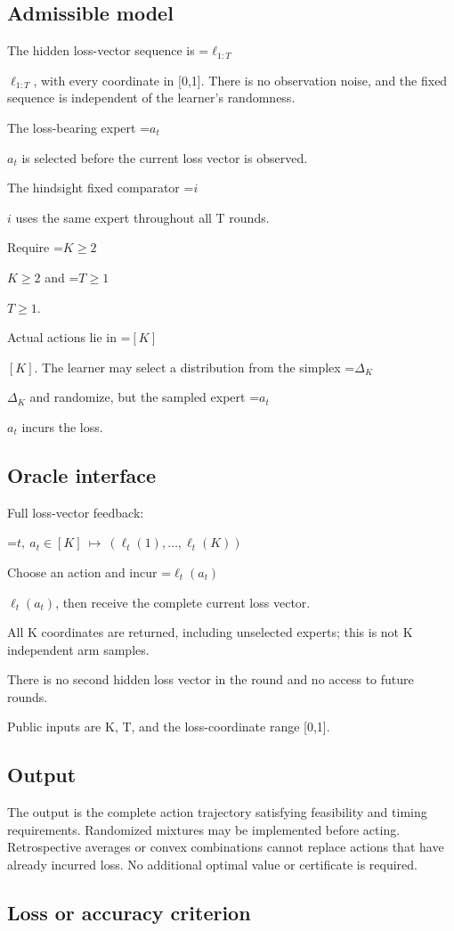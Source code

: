 \documentclass[10pt,a4paper]{article}
\newcommand{\AtlasMath}[1]{\par\begingroup\centering\setbox0=\hbox{$\displaystyle #1$}\ifdim\wd0>1.4\linewidth\typeout{ATLAS WIDE FORMULA: \the\wd0}\fi\ifdim\wd0>\linewidth\resizebox{\linewidth}{!}{\box0}\else\box0\fi\par\endgroup}
\newcommand{\AtlasInlineMath}[1]{\begingroup\setbox0=\hbox{$#1$}\ifdim\wd0>.4\linewidth\endgroup\AtlasMath{#1}\else\endgroup$#1$\fi}
\begin{document}
\subsection{Admissible model}
The hidden loss-vector sequence is \AtlasInlineMath{\ell_{1:T}}, with every coordinate in [0,1]. There is no observation noise, and the fixed sequence is independent of the learner's randomness.

The loss-bearing expert \AtlasInlineMath{a_t} is selected before the current loss vector is observed.

The hindsight fixed comparator \AtlasInlineMath{i} uses the same expert throughout all T rounds.

Require \AtlasInlineMath{K\ge2} and \AtlasInlineMath{T\ge1}.

Actual actions lie in \AtlasInlineMath{[K]}. The learner may select a distribution from the simplex \AtlasInlineMath{\Delta_K} and randomize, but the sampled expert \AtlasInlineMath{a_t} incurs the loss.

\subsection{Oracle interface}
Full loss-vector feedback:


\AtlasMath{t,\ a_t\in[K]\ \longmapsto\ (\ell_t(1),\ldots,\ell_t(K))}


Choose an action and incur \AtlasInlineMath{\ell_t(a_t)}, then receive the complete current loss vector.

All K coordinates are returned, including unselected experts; this is not K independent arm samples.

There is no second hidden loss vector in the round and no access to future rounds.

Public inputs are K, T, and the loss-coordinate range [0,1].

\subsection{Output}
The output is the complete action trajectory satisfying feasibility and timing requirements. Randomized mixtures may be implemented before acting. Retrospective averages or convex combinations cannot replace actions that have already incurred loss. No additional optimal value or certificate is required.

\subsection{Loss or accuracy criterion}
\end{document}
